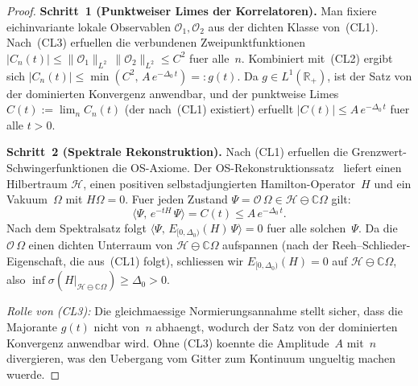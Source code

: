 \documentclass[12pt,a4paper]{article}
\theoremstyle{definition}
\theoremstyle{plain}
\theoremstyle{remark}
\begin{document}
\begin{proof}
\textbf{Schritt~1 (Punktweiser Limes der Korrelatoren).}
Man fixiere eichinvariante lokale Observablen $\mathcal{O}_1, \mathcal{O}_2$ aus der
dichten Klasse von~(CL1). Nach~(CL3) erfuellen die verbundenen Zweipunktfunktionen
$|C_n(t)| \leq \|\mathcal{O}_1\|_{L^2}\,\|\mathcal{O}_2\|_{L^2} \leq C^2$
fuer alle~$n$. Kombiniert mit~(CL2) ergibt sich $|C_n(t)| \leq \min(C^2,\,A\,e^{-\Delta_0\,t})
=: g(t)$. Da $g \in L^1(\mathbb{R}_+)$, ist der Satz von der dominierten Konvergenz
anwendbar, und der punktweise Limes $C(t) := \lim_n C_n(t)$ (der nach~(CL1) existiert)
erfuellt $|C(t)| \leq A\,e^{-\Delta_0\,t}$ fuer alle $t > 0$.

\textbf{Schritt~2 (Spektrale Rekonstruktion).}
Nach (CL1) erfuellen die Grenzwert-Schwingerfunktionen die OS-Axiome. Der
OS-Rekonstruktionssatz~\cite{OsterwalderSchrader1973} liefert einen
Hilbertraum $\mathcal{H}$, einen positiven selbstadjungierten Hamilton-Operator~$H$
und ein Vakuum~$\Omega$ mit $H\Omega = 0$. Fuer jeden Zustand
$\Psi = \mathcal{O}\,\Omega \in \mathcal{H} \ominus \mathbb{C}\Omega$ gilt:
\[
    \langle \Psi,\,e^{-tH}\,\Psi \rangle = C(t) \leq A\,e^{-\Delta_0\,t}.
\]
Nach dem Spektralsatz folgt $\langle \Psi,\,E_{[0,\Delta_0)}(H)\,\Psi \rangle = 0$
fuer alle solchen~$\Psi$. Da die $\mathcal{O}\,\Omega$ einen dichten Unterraum
von $\mathcal{H} \ominus \mathbb{C}\Omega$ aufspannen (nach der Reeh--Schlieder-Eigenschaft,
die aus~(CL1) folgt), schliessen wir $E_{[0,\Delta_0)}(H) = 0$ auf
$\mathcal{H} \ominus \mathbb{C}\Omega$, also $\inf\sigma(H|_{\mathcal{H}
\ominus \mathbb{C}\Omega}) \geq \Delta_0 > 0$.

\emph{Rolle von (CL3):} Die gleichmaessige Normierungsannahme stellt sicher, dass die
Majorante $g(t)$ nicht von~$n$ abhaengt, wodurch der Satz von der dominierten Konvergenz
anwendbar wird. Ohne (CL3) koennte die Amplitude~$A$ mit~$n$ divergieren, was den
Uebergang vom Gitter zum Kontinuum ungueltig machen wuerde.
\end{proof}
\end{document}
